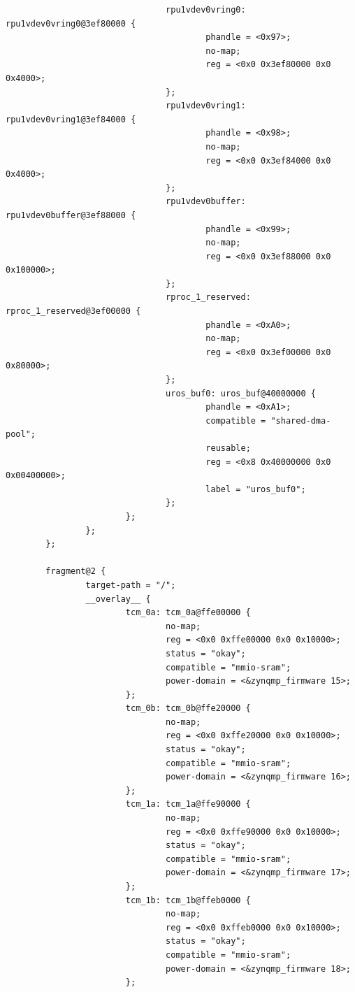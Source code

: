 \documentclass[10pt]{article}
\begin{document}
\begin{verbatim}
                                rpu1vdev0vring0: rpu1vdev0vring0@3ef80000 {
                                        phandle = <0x97>;
                                        no-map;
                                        reg = <0x0 0x3ef80000 0x0 0x4000>;
                                };
                                rpu1vdev0vring1: rpu1vdev0vring1@3ef84000 {
                                        phandle = <0x98>;
                                        no-map;
                                        reg = <0x0 0x3ef84000 0x0 0x4000>;
                                };
                                rpu1vdev0buffer: rpu1vdev0buffer@3ef88000 {
                                        phandle = <0x99>;
                                        no-map;
                                        reg = <0x0 0x3ef88000 0x0 0x100000>;
                                };
                                rproc_1_reserved: rproc_1_reserved@3ef00000 {
                                        phandle = <0xA0>;
                                        no-map;
                                        reg = <0x0 0x3ef00000 0x0 0x80000>;
                                };
                                uros_buf0: uros_buf@40000000 {
                                        phandle = <0xA1>;
                                        compatible = "shared-dma-pool";
                                        reusable;
                                        reg = <0x8 0x40000000 0x0 0x00400000>;
                                        label = "uros_buf0";
                                };
                        };
                };
        };

        fragment@2 {
                target-path = "/";
                __overlay__ {
                        tcm_0a: tcm_0a@ffe00000 {
                                no-map;
                                reg = <0x0 0xffe00000 0x0 0x10000>;
                                status = "okay";
                                compatible = "mmio-sram";
                                power-domain = <&zynqmp_firmware 15>;
                        };
                        tcm_0b: tcm_0b@ffe20000 {
                                no-map;
                                reg = <0x0 0xffe20000 0x0 0x10000>;
                                status = "okay";
                                compatible = "mmio-sram";
                                power-domain = <&zynqmp_firmware 16>;
                        };
                        tcm_1a: tcm_1a@ffe90000 {
                                no-map;
                                reg = <0x0 0xffe90000 0x0 0x10000>;
                                status = "okay";
                                compatible = "mmio-sram";
                                power-domain = <&zynqmp_firmware 17>;
                        };
                        tcm_1b: tcm_1b@ffeb0000 {
                                no-map;
                                reg = <0x0 0xffeb0000 0x0 0x10000>;
                                status = "okay";
                                compatible = "mmio-sram";
                                power-domain = <&zynqmp_firmware 18>;
                        };


\end{verbatim}
\end{document}
